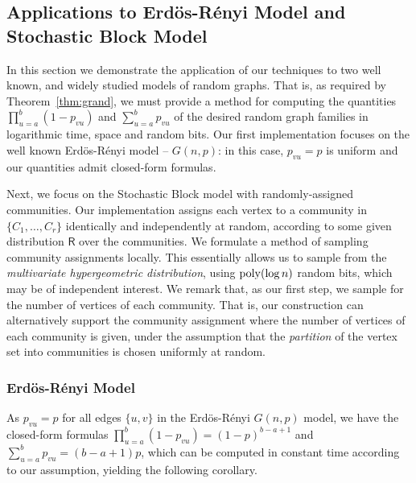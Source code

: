 \subsection{Applications to Erd\"{o}s-R\'{e}nyi Model and Stochastic Block Model}
\label{sec:undirected_applications}
In this section we demonstrate the application of our techniques to
two well known, and widely studied models of random graphs. That is, as required by Theorem~\ref{thm:grand}, we must provide a method for computing the quantities $\prod_{u=a}^b (1-p_{vu})$ and $\sum_{u=a}^b p_{vu}$ of the desired random graph families in logarithmic time, space and random bits.
Our first implementation focuses on the well known Erd\"{o}s-R\'{e}nyi model -- $G(n,p)$: in this case, $p_{vu} = p$ is uniform and our quantities admit closed-form formulas.

Next, we focus on the Stochastic Block model with randomly-assigned communities.
Our implementation assigns each vertex to a community in $\{C_1, \ldots, C_r\}$ identically and independently at random, according to some given distribution $\mathsf{R}$ over the communities. We formulate a method of sampling community assignments locally.
This essentially allows us to sample from the \emph{multivariate hypergeometric distribution},
using $\mathrm{poly}(\log n)$ random bits, which may be of independent interest. We remark that, as our first step, we sample for the number of vertices of each community. That is, our construction can alternatively support the community assignment where the number of vertices of each community is given, under the assumption that the \emph{partition} of the vertex set into communities is chosen uniformly at random.

\subsubsection{Erd\"{o}s-R\'{e}nyi Model}
\label{sec:app_er}
As $p_{vu} = p$ for all edges $\{u,v\}$ in the Erd\"{o}s-R\'{e}nyi $G(n,p)$ model, we have the closed-form formulas $\prod_{u=a}^b (1-p_{vu}) = (1-p)^{b-a+1}$ and $\sum_{u=a}^b p_{vu} = (b-a+1)p$, which can be computed in constant time according to our assumption, yielding the following corollary.

